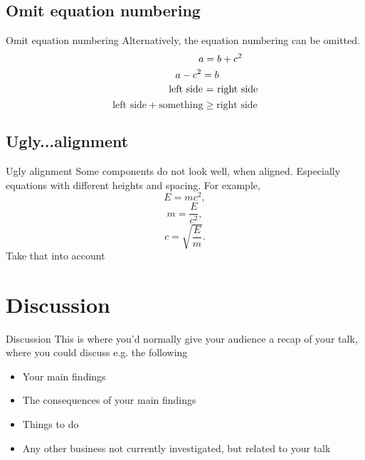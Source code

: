 \documentclass{beamer}
\begin{document}
\subsection{Omit equation numbering}
\begin{frame}{Omit equation numbering}
Alternatively, the equation numbering can be omitted.
\begin{equation*}\hspace{1 in}
    a=b+c^2
\end{equation*}
\begin{equation*}\hspace{0.35 in}
    a-c^2=b
\end{equation*}
\begin{equation*}\hspace{0.8 in}
    \text{left side = right side}
\end{equation*}
\begin{equation*}
    \text{left side} +\text{something} \geq \text{right side} 
\end{equation*}
\end{frame}

\subsection{Ugly...alignment}
\begin{frame}{Ugly alignment}
Some components do not look well, when aligned. Especially equations with different heights and spacing. For example,
\begin{equation}
    E=mc^2,
\end{equation}
\begin{equation}
m=\frac{E}{c^2},
\end{equation}
\begin{equation}
    c= \sqrt{\frac{E}{m}}.
\end{equation}
Take that into account
\end{frame}

\section{Discussion}
\begin{frame}{Discussion}
This is where you’d normally give your audience a recap of your talk, where you could discuss e.g. the following
\begin{itemize}
    \item Your main findings
    \item The consequences of your main findings
    \item Things to do
    \item Any other business not currently investigated, but related to your talk
\end{itemize}
\end{frame}
\end{document}
